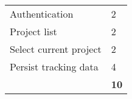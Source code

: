 %
%
		\begin{longtable}{|p{8.9cm}|p{2.5cm}|}
			\hline
			\tableheaderfunction & 
			\tableheadereffort \\
			\hline
			\hline
			 Authentication&
			2 
			\\
			\hline
			 Project list&
			2 
			\\
			\hline
			 Select current project&
			2 
			\\
			\hline
			 Persist tracking data&
			4 
			\\
			\hline
			\hline
			\textbf{\tablefootertotaleffort} &
			\textbf{10} \\
			\hline
		\end{longtable}

